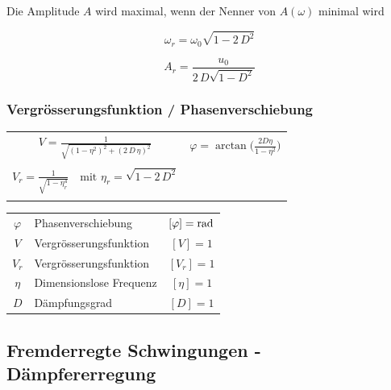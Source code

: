 Die Amplitude $A$ wird maximal, wenn der Nenner von $A(\omega)$ minimal wird 

\begin{minipage}{0.48\linewidth}
$$ \boxed{ \omega_r = \omega_0 \sqrt{1 - 2 \, D^2} } $$
\end{minipage}
\hfill
\begin{minipage}{0.48\linewidth}
$$ \boxed{ A_r = \frac{u_0}{2 \, D \sqrt{1 - D^2}} }$$
\end{minipage}


\subsubsection{Vergrösserungsfunktion / Phasenverschiebung}

\begin{tabular}{c c}
$ \boxed{ V = \frac{1}{\sqrt{(1- \eta^2)^2 + (2 \, D \, \eta)^2} } } $ & $ \boxed{ \varphi = \arctan \Big( \frac{2 D \eta}{1 - \eta^2}  \Big) } $ \\
\\
$ \boxed{ V_r = \frac{1}{\sqrt{ 1 - \eta_r^4} } \quad \text{mit } \eta_r = \sqrt{1 - 2 \, D^2}  } $ \\
\\
\end{tabular}


\begin{tabular}{c l c}
$\varphi$ & Phasenverschiebung & $[ \varphi] = \mathrm{rad}$ \\
$V$ & Vergrösserungsfunktion & $[V] = 1$ \\
$V_r$ & Vergrösserungsfunktion & $[V_r] = 1$ \\
$\eta$ & Dimensionslose Frequenz & $[\eta] = 1$  \\
$D$ & Dämpfungsgrad & $[D] = 1$ 
\end{tabular}




\subsection{Fremderregte Schwingungen - Dämpfererregung}

